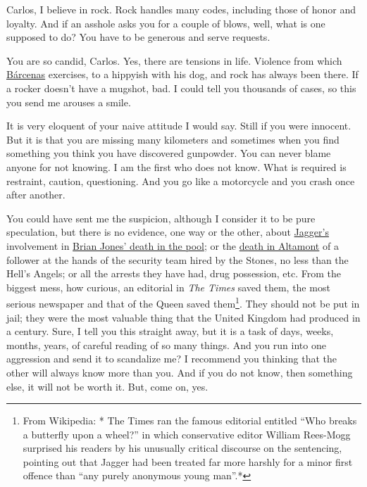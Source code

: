 \documentclass[]{book}
\let\rmarkdownfootnote\footnote%
\def\footnote{\protect\rmarkdownfootnote}
\begin{document}
Carlos, I believe in rock. Rock handles many codes, including those of honor and loyalty. And if an asshole asks you for a couple of blows, well, what is one supposed to do? You have to be generous and serve requests.

You are so candid, Carlos. Yes, there are tensions in life. Violence from which \href{https://en.wikipedia.org/wiki/Luis_B\%C3\%A1rcenas}{Bárcenas} exercises, to a hippyish with his dog, and rock has always been there. If a rocker doesn't have a mugshot, bad. I could tell you thousands of cases, so this you send me arouses a smile.

It is very eloquent of your naive attitude I would say. Still if you were innocent. But it is that you are missing many kilometers and sometimes when you find something you think you have discovered gunpowder. You can never blame anyone for not knowing. I am the first who does not know. What is required is restraint, caution, questioning. And you go like a motorcycle and you crash once after another.

You could have sent me the suspicion, although I consider it to be pure speculation, but there is no evidence, one way or the other, about \href{https://en.wikipedia.org/wiki/Mick_Jagger}{Jagger's} involvement in \href{https://en.wikipedia.org/wiki/Brian_Jones}{Brian Jones' death in the pool}; or the \href{https://en.wikipedia.org/wiki/Altamont_Free_Concert\#Death_of_Meredith_Hunter}{death in Altamont} of a follower at the hands of the security team hired by the Stones, no less than the Hell's Angels; or all the arrests they have had, drug possession, etc. From the biggest mess, how curious, an editorial in \emph{The Times} saved them, the most serious newspaper and that of the Queen saved them\footnote{From Wikipedia: * The Times ran the famous editorial entitled ``Who breaks a butterfly upon a wheel?'' in which conservative editor William Rees-Mogg surprised his readers by his unusually critical discourse on the sentencing, pointing out that Jagger had been treated far more harshly for a minor first offence than ``any purely anonymous young man''.*}. They should not be put in jail; they were the most valuable thing that the United Kingdom had produced in a century. Sure, I tell you this straight away, but it is a task of days, weeks, months, years, of careful reading of so many things. And you run into one aggression and send it to scandalize me? I recommend you thinking that the other will always know more than you. And if you do not know, then something else, it will not be worth it. But, come on, yes.
\end{document}
